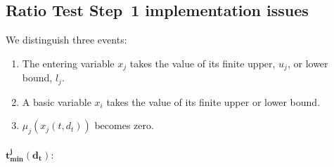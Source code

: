 \documentclass[a4paper]{article}
\begin{document}
\subsection{Ratio Test Step~1 implementation issues}
We distinguish three events:
\begin{enumerate}
\item The entering variable $x_{j}$ takes the value of its finite upper,
$u_{j}$, or lower bound, $l_{j}$.
\item A basic variable $x_{i}$ takes the value of its finite upper or lower bound.
\item $\mu_{j}(x_{j}(t, d_{t}))$ becomes zero.
\end{enumerate}

\paragraph{$\mathbf{t_{min}^{j}(d_{t}):}$}
\end{document}

